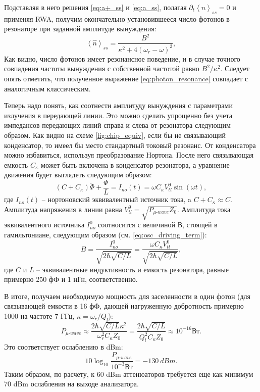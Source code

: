 \documentclass[12pt, twoside]{report}
\numberwithin{equation}{section}
\numberwithin{figure}{section}
\begin{document}
Подставляя в него решения \eqref{eq:a+_ss} и \eqref{eq:a_ss}, полагая $\partial_t \left< \hat n \right>_{ss} = 0$ и применяя RWA, получим окончательно установившееся число фотонов в резонаторе при заданной амплитуде вынуждения:
\begin{equation}
\left< \hat n \right>_{ss} = \frac{B^2}{\kappa^2 + 4(\omega_r - \omega)^2},
\label{eq:photon_resonance}
\end{equation} 
Как видно, число фотонов имеет резонансное поведение, и в случае точного совпадения частоты вынуждения с собственной частотой равно $B^2/\kappa^2$. Следует опять отметить, что полученное выражение \eqref{eq:photon_resonance} совпадает с аналогичным классическим\cite{thuneberg2013}.

Теперь надо понять, как соотнести амплитуду вынуждения с параметрами излучения в передающей линии. Это можно сделать упрощенно без учета импедансов передающих линий справа и слева от резонатора следующим образом. Как видно на схеме \autoref{fig:chip_equiv}, если бы не связывающий конденсатор, то имеел бы место стандартный токовый резонанс. От конденсатора можно избавиться, используя преобразование Нортона. После него связывающая емкость $C_\kappa$ может быть включена в конденсатор резонатора, а уравнение движения будет выглядеть следующим образом: 
$$
(C+C_\kappa) \ddot{\Phi} + \frac{\Phi}{L} = I_{no}(t) = \omega C_\kappa V^0_{tl} \sin(\omega t),
$$
где $I_{no}(t)$ -- нортоновский эквивалентный источник тока, a $C+C_\kappa\approx C$. Амплитуда напряжения в линии равна $V_{tl}^0 = \sqrt{P_{\mu\text{-}wave}Z_0}$. Амплитуда тока эквивалентного источника $I^0_{no}$ соотносится с величиной $В$, стоящей в гамильтониане, следующим образом (см. \eqref{eq:osc_driving_term}): 
$$
B = \frac{I_{no}^0}{\sqrt{2\hbar \sqrt{C/L}}} = \frac{\omega C_\kappa V_{tl}^0} {\sqrt{2\hbar \sqrt{C/L}}},
$$
где $C$ и $L$ -- эквивалентные индуктивность и емкость резонатора, равные примерно 250 фФ и 1 нГн, соответственно\cite{Jerger2013}. 

В итоге, получаем необходимую мощность для заселенности в один фотон (для связывающей емкости в 16 фФ, дающей нагруженную добротность примерно 1000 на частоте 7 ГГц, $\kappa = \omega_r/Q_l$):
$$
P_{\mu\text{-}wave} \approx \frac{2\hbar \sqrt{C/L} \kappa^2}{\omega_r^2 C_\kappa Z_0} = \frac{2\hbar \sqrt{C/L}}{Q_l^2 C_\kappa Z_0}  \approx 10^{-16} \text{Вт}.
$$
Это соответствует ослаблению в dBm:
$$10 \log_{10} \frac{P_{\mu\text{-}wave}}{10^{-3} \text{Вт}} = -130\ dBm.$$
Таким образом, по расчету, к 60 dBm аттенюаторов требуется еще как минимум 70 dBm ослабления на выходе анализатора. 
\end{document}
